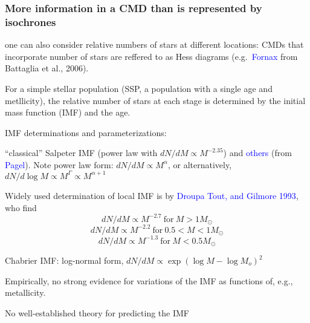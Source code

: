 \documentclass[12pt]{article}
\begin{document}
  \subsubsection*{More information in a CMD than is represented by isochrones}
  one can also consider relative numbers of stars at
      different locations: CMDs that incorporate number of stars are
      reffered to as Hess diagrams (e.g.\ \textcolor{blue}{Fornax}
      from Battaglia et al., 2006).
      \begin{itemize*}
          \item For a simple stellar population (SSP, a population with
              a single age and metllicity), the relative number of stars
              at each stage is determined by the initial mass function (IMF)
              and the age.
          \item IMF determinations and parameterizations:
              \begin{itemize*}
                  \item ``classical'' Salpeter IMF (power law with
                      $ dN/dM \propto M^{-2.35}$) and \textcolor{blue}{others}
                      (from \textcolor{blue}{Pagel}). Note power law form:
                      $ dN/dM \propto M^{\alpha}  $,
                      or alternatively,
                      $ dN/d\log{M} \propto M^{\Gamma} \propto M^{\alpha + 1} $
                  \item Widely used determination of local IMF is by
                      \textcolor{blue}{Droupa Tout, and Gilmore 1993}, who find
                      $$ dN/dM \propto M^{-2.7}\ \textrm{for}\ M > 1M_{\odot} $$
                      $$ dN/dM \propto M^{-2.2}\ \textrm{for}\ 0.5 < M < 1M_{\odot} $$
                      $$ dN/dM \propto M^{-1.3}\ \textrm{for}\ M < 0.5M_{\odot} $$
                  \item Chabrier IMF: log-normal form,
                      $ dN/dM \propto \exp(\log{M}-\log{M_o})^2  $
                  \item Empirically, no strong evidence for variations of the
                    IMF as functions of, e.g., metallicity.
                  \item No well-established theory for predicting the IMF
              \end{itemize*}
      \end{itemize*}
\end{document}
